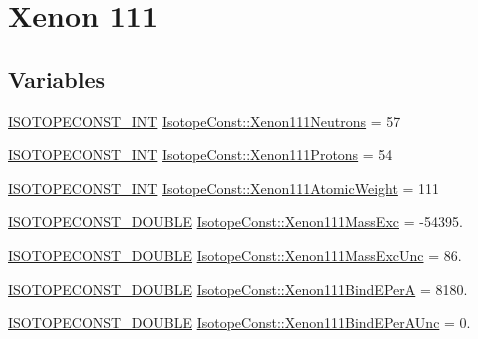 \hypertarget{group___isotope_const-_xenon-_xe111}{}\section{Xenon 111}
\label{group___isotope_const-_xenon-_xe111}
\subsection*{Variables}
\begin{DoxyCompactItemize}
\item 
\mbox{\hyperlink{group___isotope_const-_macros_ga5f18360b3e99483a35c32d789e62621c}{I\+S\+O\+T\+O\+P\+E\+C\+O\+N\+S\+T\+\_\+\+I\+NT}} \mbox{\hyperlink{group___isotope_const-_xenon-_xe111_gae80cf55ab8f6b690464ae2d7d14457c1}{Isotope\+Const\+::\+Xenon111\+Neutrons}} = 57
\item 
\mbox{\hyperlink{group___isotope_const-_macros_ga5f18360b3e99483a35c32d789e62621c}{I\+S\+O\+T\+O\+P\+E\+C\+O\+N\+S\+T\+\_\+\+I\+NT}} \mbox{\hyperlink{group___isotope_const-_xenon-_xe111_ga42d98054be032393ed3f44888e229f4e}{Isotope\+Const\+::\+Xenon111\+Protons}} = 54
\item 
\mbox{\hyperlink{group___isotope_const-_macros_ga5f18360b3e99483a35c32d789e62621c}{I\+S\+O\+T\+O\+P\+E\+C\+O\+N\+S\+T\+\_\+\+I\+NT}} \mbox{\hyperlink{group___isotope_const-_xenon-_xe111_ga686c9ebb6f45739e5de78e9b5051bd73}{Isotope\+Const\+::\+Xenon111\+Atomic\+Weight}} = 111
\item 
\mbox{\hyperlink{group___isotope_const-_macros_ga8f45a7272ce02c0b4c65c44636ed719a}{I\+S\+O\+T\+O\+P\+E\+C\+O\+N\+S\+T\+\_\+\+D\+O\+U\+B\+LE}} \mbox{\hyperlink{group___isotope_const-_xenon-_xe111_ga728dec9de081b28ceae5b1cc9a08df99}{Isotope\+Const\+::\+Xenon111\+Mass\+Exc}} = -\/54395.
\item 
\mbox{\hyperlink{group___isotope_const-_macros_ga8f45a7272ce02c0b4c65c44636ed719a}{I\+S\+O\+T\+O\+P\+E\+C\+O\+N\+S\+T\+\_\+\+D\+O\+U\+B\+LE}} \mbox{\hyperlink{group___isotope_const-_xenon-_xe111_gabca3c12a789904324da2cb4fa29866bd}{Isotope\+Const\+::\+Xenon111\+Mass\+Exc\+Unc}} = 86.
\item 
\mbox{\hyperlink{group___isotope_const-_macros_ga8f45a7272ce02c0b4c65c44636ed719a}{I\+S\+O\+T\+O\+P\+E\+C\+O\+N\+S\+T\+\_\+\+D\+O\+U\+B\+LE}} \mbox{\hyperlink{group___isotope_const-_xenon-_xe111_ga3d141a6ceb824e2d318841537f1de131}{Isotope\+Const\+::\+Xenon111\+Bind\+E\+PerA}} = 8180.
\item 
\mbox{\hyperlink{group___isotope_const-_macros_ga8f45a7272ce02c0b4c65c44636ed719a}{I\+S\+O\+T\+O\+P\+E\+C\+O\+N\+S\+T\+\_\+\+D\+O\+U\+B\+LE}} \mbox{\hyperlink{group___isotope_const-_xenon-_xe111_gac82f59f015f48f297d2760d896985e7f}{Isotope\+Const\+::\+Xenon111\+Bind\+E\+Per\+A\+Unc}} = 0.

\end{DoxyCompactItemize}
